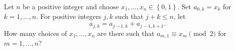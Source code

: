 Let $n$ be a positive integer and choose $x_1,\ldots,x_n\in\left\{0,1\right\}$. Set $a_{0,k}=x_k$ for $k=1,\ldots,n$. For positive integers $j,k$ such that $j+k\leq n$, let \[a_{j,k}=a_{j-1,k}+a_{j-1,k+1}.\] How many choices of $x_1,\ldots,x_n$ are there such that $a_{m,1}\equiv x_m\pmod{2}$ for $m=1,\ldots,n$?